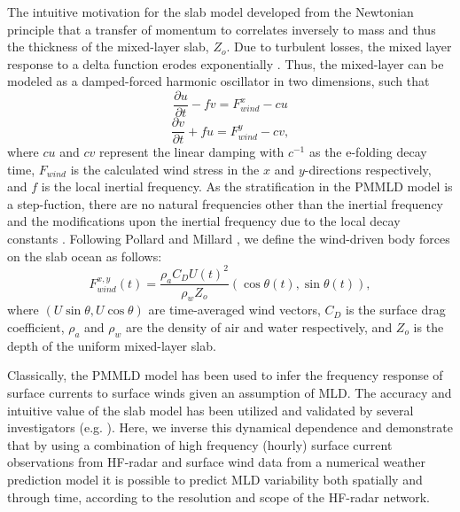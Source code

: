 \documentclass{article}
\begin{document}
The intuitive motivation for the slab model developed from the Newtonian principle that a transfer of momentum to correlates inversely to mass and thus the thickness of the mixed-layer slab, $Z_o$. 
Due to turbulent losses, the mixed layer response to a delta function erodes exponentially \cite{Large1994}.
Thus, the mixed-layer can be modeled as a damped-forced harmonic oscillator in two dimensions, such that
\begin{equation}
    \frac{\partial u}{\partial t} - f v = F^{x}_{wind} - cu
\end{equation}
\begin{equation}
    \frac{\partial v}{\partial t} + f u = F^{y}_{wind} - cv,
\end{equation}
where $c{u}$ and $c{v}$ represent the linear damping with $c^{-1}$ as the e-folding decay time, $F_{wind}$ is the calculated wind stress in the $x$ and $y$-directions respectively, and $f$ is the local inertial frequency.
As the stratification in the PMMLD model is a step-fuction, there are no natural frequencies other than the inertial frequency and the modifications upon the inertial frequency due to the local decay constants \cite{Pollard1970a}. 
Following Pollard and Millard \cite{Pollard1970a}, we define the wind-driven body forces on the slab ocean as follows:
\begin{equation}
        F^{x,y}_{wind}(t) = \frac{\rho_a C_D U(t)^{2}}{\rho_w Z_o} (\cos\theta(t),\sin\theta(t)),  
\end{equation}
where $ \left ( U\sin\theta, U\cos\theta \right ) $ are time-averaged wind vectors, $C_D$ is the surface drag coefficient, $\rho_a$ and $\rho_w$ are the density of air and water respectively, and $Z_o$ is the depth of the uniform mixed-layer slab.

Classically, the PMMLD model has been used to infer the frequency response of surface currents to surface winds given an assumption of MLD. 
The accuracy and intuitive value of the slab model has been utilized and validated by several investigators (e.g.  \cite{DAsaro1989,Jeronimo2010,Nam2013}).
Here, we inverse this dynamical dependence and demonstrate that by using a combination of high frequency (hourly) surface current observations from HF-radar and surface wind data from a numerical weather prediction model it is possible to predict MLD variability both spatially and through time, according to the resolution and scope of the HF-radar network. 
\end{document}
